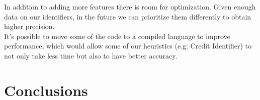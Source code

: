 \documentclass[paper=a4, fontsize=11pt]{scrartcl} %
\numberwithin{equation}{section} %
\numberwithin{figure}{section} %
\numberwithin{table}{section} %
\begin{document}
In addition to adding more features there is room for optimization. Given enough data on our identifiers, in the future we can prioritize them differently to obtain higher precision. \\

It's possible to move some of the code to a compiled language to improve performance, which would allow some of our heuristics (e.g: Credit Identifier) to not only take less time but also to have better accuracy. \\ 


\section{Conclusions}
\label{sec:conclusions}

\end{document}

